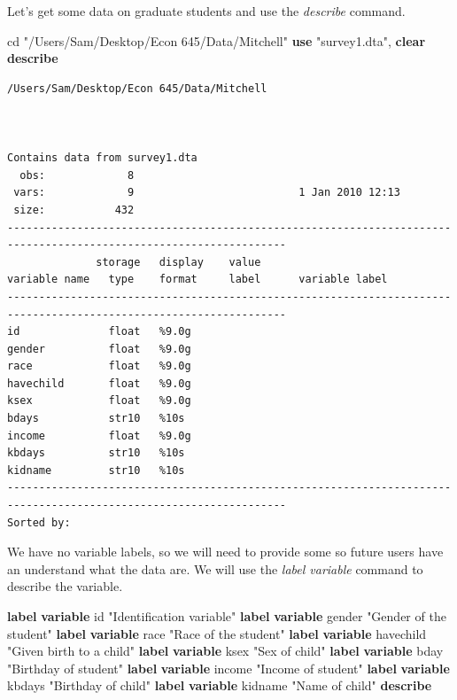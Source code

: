 \documentclass[
]{book}
\newenvironment{Shaded}{\begin{snugshade}}{\end{snugshade}}
\newcommand{\KeywordTok}[1]{\textcolor[rgb]{0.13,0.29,0.53}{\textbf{#1}}}
\newcommand{\NormalTok}[1]{#1}
\newcommand{\StringTok}[1]{\textcolor[rgb]{0.31,0.60,0.02}{#1}}
\begin{document}
Let's get some data on graduate students and use the \emph{describe} command.

\begin{Shaded}
\begin{Highlighting}[]
\NormalTok{cd }\StringTok{"/Users/Sam/Desktop/Econ 645/Data/Mitchell"}
\KeywordTok{use} \StringTok{"survey1.dta"}\NormalTok{, }\KeywordTok{clear}
\KeywordTok{describe} 
\end{Highlighting}
\end{Shaded}

\begin{verbatim}
/Users/Sam/Desktop/Econ 645/Data/Mitchell



Contains data from survey1.dta
  obs:             8                          
 vars:             9                          1 Jan 2010 12:13
 size:           432                          
------------------------------------------------------------------------------------------------------------------
              storage   display    value
variable name   type    format     label      variable label
------------------------------------------------------------------------------------------------------------------
id              float   %9.0g                 
gender          float   %9.0g                 
race            float   %9.0g                 
havechild       float   %9.0g                 
ksex            float   %9.0g                 
bdays           str10   %10s                  
income          float   %9.0g                 
kbdays          str10   %10s                  
kidname         str10   %10s                  
------------------------------------------------------------------------------------------------------------------
Sorted by: 
\end{verbatim}

We have no variable labels, so we will need to provide some so future users have an understand what the data are. We will use the \emph{label variable} command to describe the variable.

\begin{Shaded}
\begin{Highlighting}[]
\KeywordTok{label} \KeywordTok{variable}\NormalTok{ id }\StringTok{"Identification variable"}
\KeywordTok{label} \KeywordTok{variable}\NormalTok{ gender }\StringTok{"Gender of the student"}
\KeywordTok{label} \KeywordTok{variable}\NormalTok{ race }\StringTok{"Race of the student"}
\KeywordTok{label} \KeywordTok{variable}\NormalTok{ havechild }\StringTok{"Given birth to a child"}
\KeywordTok{label} \KeywordTok{variable}\NormalTok{ ksex }\StringTok{"Sex of child"}
\KeywordTok{label} \KeywordTok{variable}\NormalTok{ bday }\StringTok{"Birthday of student"}
\KeywordTok{label} \KeywordTok{variable}\NormalTok{ income }\StringTok{"Income of student"}
\KeywordTok{label} \KeywordTok{variable}\NormalTok{ kbdays }\StringTok{"Birthday of child"}
\KeywordTok{label} \KeywordTok{variable}\NormalTok{ kidname }\StringTok{"Name of child"}
\KeywordTok{describe}
\end{Highlighting}
\end{Shaded}
\end{document}
